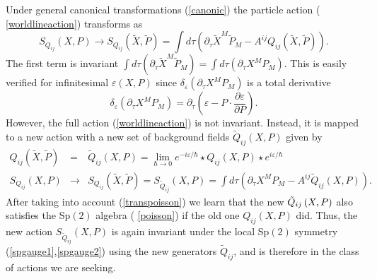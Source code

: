 \documentclass[a4paper,12pt]{article}
\begin{document}
Under general canonical transformations (\ref{canonic}) the particle action (%
\ref{worldlineaction}) transforms as
\begin{equation}
S_{Q_{ij}}\left( X,P\right) \rightarrow S_{Q_{ij}}\left( \tilde{X},\tilde{P}%
\right) =\int d\tau \left( \partial _{\tau }\tilde{X}^{M}\tilde{P}%
_{M}-A^{ij}Q_{ij}\left( \tilde{X},\tilde{P}\right) \right) .
\end{equation}
The first term is invariant $\int d\tau \left( \partial _{\tau }\tilde{X}^{M}%
\tilde{P}_{M}\right) =\int d\tau \left( \partial _{\tau }X^{M}P_{M}\right) .$
This is easily verified for infinitesimal $\varepsilon \left( X,P\right) $
since $\delta _{\varepsilon }\left( \partial _{\tau }X^{M}P_{M}\right) $ is
a total derivative
\[
\delta _{\varepsilon }\left( \partial _{\tau }X^{M}P_{M}\right) =\partial
_{\tau }\left( \varepsilon -P\cdot \frac{\partial \varepsilon }{\partial P}%
\right) .
\]
However, the full action (\ref{worldlineaction}) is not invariant. Instead,
it is mapped to a new action with a new set of background fields $\tilde{Q}%
_{ij}\left( X,P\right) $ given by
\begin{eqnarray}
Q_{ij}\left( \tilde{X},\tilde{P}\right) &=&\tilde{Q}_{ij}\left( X,P\right)
=\lim_{\hbar \rightarrow 0}e^{-i\varepsilon /\hbar }\star Q_{ij}\left(
X,P\right) \star e^{i\varepsilon /\hbar }  \label{Qprime} \\
S_{Q_{ij}}\left( X,P\right) &\rightarrow &S_{Q_{ij}}\left( \tilde{X},\tilde{P%
}\right) =S_{\tilde{Q}_{ij}}\left( X,P\right) =\int d\tau \left( \partial
_{\tau }X^{M}P_{M}-A^{ij}\tilde{Q}_{ij}\left( X,P\right) \right) .
\end{eqnarray}
After taking into account (\ref{transpoisson}) we learn that the new $\tilde{%
Q}_{ij}\left( X,P\right) $ also satisfies the Sp$\left( 2\right) $ algebra (%
\ref{poisson}) if the old one $Q_{ij}\left( X,P\right) $ did. Thus, the new
action $S_{\tilde{Q}_{ij}}\left( X,P\right) $ is again invariant under the
local Sp$\left( 2\right) $ symmetry (\ref{spgauge1},\ref{spgauge2}) using
the new generators $\tilde{Q}_{ij}$, and is therefore in the class of
actions we are seeking.
\end{document}
